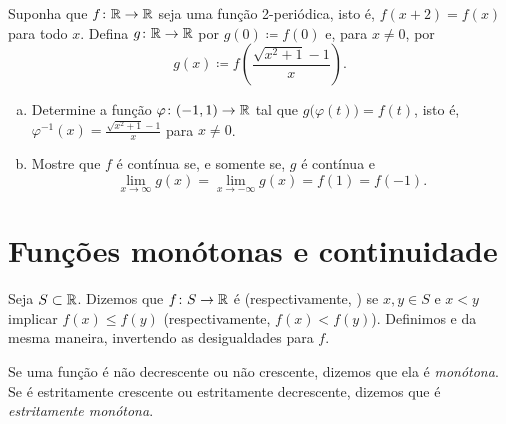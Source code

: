 \begin{exercise}
Suponha que $f \colon {\mathbb{R}} \to {\mathbb{R}}$ seja uma função 2-periódica, isto é, $f(x + 2) =
f(x)$ para todo $x$. Defina $g \colon {\mathbb{R}} \to {\mathbb{R}}$ por
$g(0) \coloneqq f(0)$ e, para $x \neq 0$, por
\begin{equation*}
g(x) \coloneqq f\left(\frac{\sqrt{x^2+1}-1}{x}\right).
\end{equation*}
\begin{enumerate}[a)]
\item
Determine a função $\varphi \colon (-1,1) \to {\mathbb{R}}$ tal que
$g\bigl(\varphi(t)\bigr) = f(t)$, isto é,
$\varphi^{-1}(x) =
\frac{\sqrt{x^2+1}-1}{x}$ para $x \neq 0$.
\item
Mostre que $f$ é contínua se, e somente se, $g$ é contínua e
\begin{equation*}
\lim_{x \to \infty} g(x) =
\lim_{x \to -\infty} g(x) =
f(1) = f(-1) .
\end{equation*}
\end{enumerate}
\end{exercise}


\sectionnewpage

\section{Funções monótonas e continuidade}
\label{sec:monotonefunc}



\begin{defn}
Seja $S \subset {\mathbb{R}}$.
Dizemos que $f \colon S \to {\mathbb{R}}$ é \emph{}
(respectivamente, \emph{}) se $x,y \in S$
e $x < y$ implicar $f(x) \leq f(y)$ (respectivamente, $f(x) < f(y)$).
Definimos
\emph{} e
\emph{} da mesma maneira, invertendo as
desigualdades para $f$.

Se uma função é não decrescente ou não crescente, dizemos que ela é
\emph{monótona}. Se é
estritamente crescente ou estritamente decrescente, dizemos que é
\emph{estritamente monótona}.
\end{defn}

